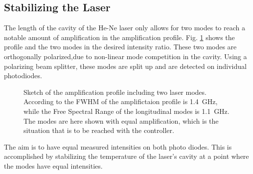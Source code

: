 \documentclass[a4paper,10pt]{article}
\begin{document}
\subsection{Stabilizing the Laser}
The length of the cavity of the He-Ne laser only allows for two modes to reach a notable amount of amplification in the amplification profile. Fig. \ref{fig_profile} shows the profile and the two modes in the desired intensity ratio. These two modes are orthogonally polarized,due to non-linear mode competition in the cavity.\cite{laserfaq} Using a polarizing beam splitter, these modes are split up and are detected on individual photodiodes.

\begin{figure}[htp!]
  \centering
  \caption{Sketch of the amplification profile including two laser modes. According to \cite{script} the FWHM of the amplifictaion profile is \SI{1.4}{\giga \hertz}, while the Free Spectral Range of the longitudinal modes is \SI{1.1}{\giga \hertz}. The modes are here shown with equal amplification, which is the situation that is to be reached with the controller.}
  \label{fig_profile}
\end{figure}
The aim is to have equal measured intensities on both photo diodes. This is accomplished by stabilizing the temperature of the laser's cavity at a point where the modes have equal intensities.
\end{document}
